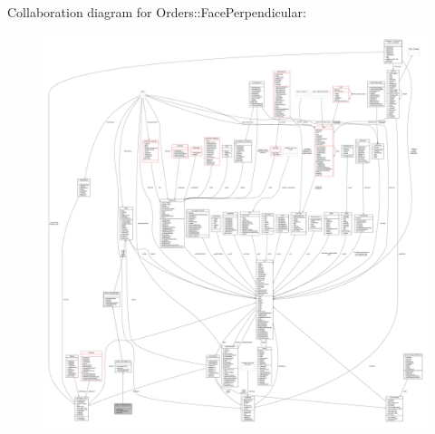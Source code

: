 Collaboration diagram for Orders\+:\+:Face\+Perpendicular\+:
\nopagebreak
\begin{figure}[H]
\begin{center}
\leavevmode
\includegraphics[width=350pt]{d5/df0/classOrders_1_1FacePerpendicular__coll__graph}
\end{center}
\end{figure}
